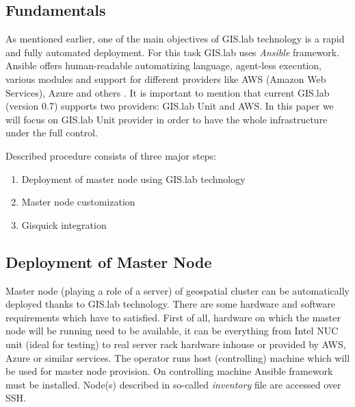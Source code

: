 \documentclass{isprs}
\begin{document}
\subsection{Fundamentals}

As mentioned earlier, one of the main objectives of GIS.lab technology
is a rapid and fully automated deployment. For this task GIS.lab uses
\textit{Ansible} framework. Ansible offers human-readable automatizing
language, agent-less execution, various modules and support for
different providers like AWS (Amazon Web Services), Azure and others
\cite{hochstein2014ansible}. It is important to mention that current
GIS.lab (version 0.7) supports two providers: GIS.lab Unit and AWS. In
this paper we will focus on GIS.lab Unit provider in order to have the
whole infrastructure under the full control.

Described procedure consists of three major steps:

\begin{enumerate}
\setlength\itemsep{0em}\setlength\parskip{0em}\setlength\topsep{0em}\setlength\partopsep{0em}\setlength\parsep{0em}
\item{Deployment of master node using GIS.lab technology} 
\item{Master node customization}
\item{Gisquick integration}
\end{enumerate}

\subsection{Deployment of Master Node}\label{Deployment of Master Node}

Master node (playing a role of a server) of geospatial cluster can be
automatically deployed thanks to GIS.lab technology. There are some
hardware and software requirements which have to satisfied. First of
all, hardware on which the master node will be running need to be
available, it can be everything from Intel NUC unit (ideal for
testing) to real server rack hardware inhouse or provided by AWS,
Azure or similar services. The operator runs host (controlling)
machine which will be used for master node provision. On controlling
machine Ansible framework must be installed. Node(s) described in
so-called \textit{inventory} file are accessed over SSH.
\end{document}
